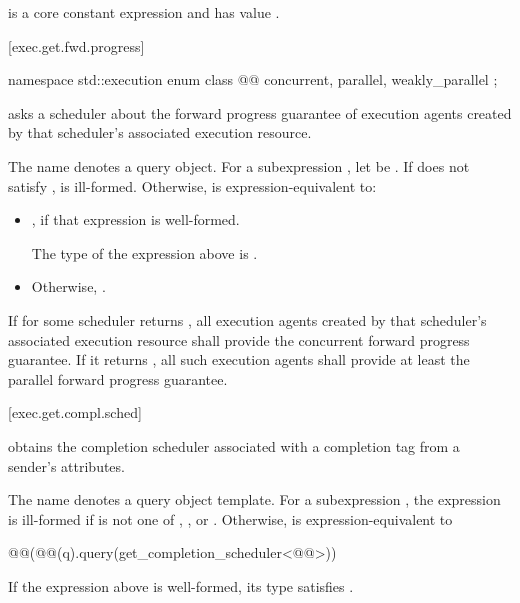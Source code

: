 \pnum
{} is
a core constant expression and has value .

[exec.get.fwd.progress]{}

\begin{codeblock}
namespace std::execution {
  enum class @@ {
    concurrent,
    parallel,
    weakly_parallel
  };
}
\end{codeblock}

\pnum
{} asks a scheduler about
the forward progress guarantee of execution agents
created by that scheduler's associated execution resource.

\pnum
The name  denotes a query object.
For a subexpression , let  be .
If  does not satisfy ,
 is ill-formed.
Otherwise,
 is expression-equivalent to:
\begin{itemize}
\item
{},
if that expression is well-formed.

\mandates
The type of the expression above is .
\item
Otherwise, .
\end{itemize}

\pnum
If  for some scheduler 
returns ,
all execution agents created by that scheduler's associated execution resource
shall provide the concurrent forward progress guarantee.
If it returns ,
all such execution agents
shall provide at least the parallel forward progress guarantee.

[exec.get.compl.sched]{}

\pnum
{} obtains
the completion scheduler associated with a completion tag
from a sender's attributes.

\pnum
The name  denotes a query object template.
For a subexpression ,
the expression 
is ill-formed if  is not one of
, , or .
Otherwise, 
is expression-equivalent to
\begin{codeblock}
@@(@@(q).query(get_completion_scheduler<@@>))
\end{codeblock}
\mandates
If the expression above is well-formed,
its type satisfies .

